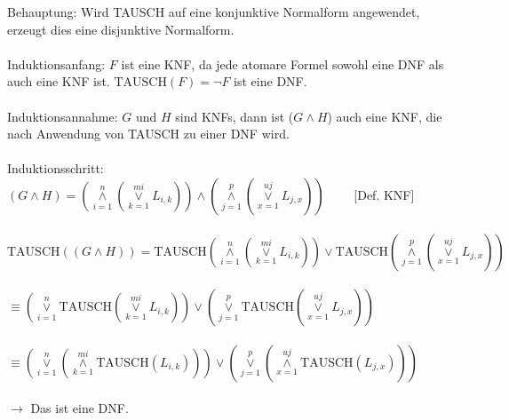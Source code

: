 \documentclass[a4paper,10pt]{scrartcl}
\begin{document}
\begin{enumerate}
\begin{enumerate}[1.]
 Behauptung: Wird TAUSCH auf eine konjunktive Normalform angewendet, erzeugt dies eine disjunktive Normalform. \\
 \\
 Induktionsanfang: $F$ ist eine KNF, da jede atomare Formel sowohl eine DNF als auch eine KNF ist.
 $\text{TAUSCH}(F) = \neg F$ ist eine DNF. \\
 \\
 Induktionsannahme: $G$ und $H$ sind KNFs, dann ist ($G \wedge H$) auch eine KNF, die nach Anwendung von TAUSCH zu
 einer DNF wird. \\
 \\
 Induktionsschritt: \\
	$(G \wedge H) = (\overset{n}{\underset{i=1}{\wedge}} (\overset{mi}{\underset{k=1}{\vee}} L_{i,k})) \wedge
	(\overset{p}{\underset{j=1}{\wedge}} (\overset{uj}{\underset{x=1}{\vee}} L_{j,x}))\quad \quad $ [Def. KNF] \\ \\
	$\text{TAUSCH}((G\wedge H)) = \text{TAUSCH}(\overset{n}{\underset{i=1}{\wedge}} (\overset{mi}{\underset{k=1}{\vee}} L_{i,k})) \vee \text{TAUSCH}(\overset{p}{\underset{j=1}{\wedge}} (\overset{uj}{\underset{x=1}{\vee}} L_{j,x}))$ \\ \\
	$\equiv (\overset{n}{\underset{i=1}{\vee}} \text{TAUSCH}(\overset{mi}{\underset{k=1}{\vee}} L_{i,k})) \vee (\overset{p}{\underset{j=1}{\vee}} \text{TAUSCH}(\overset{uj}{\underset{x=1}{\vee}} L_{j,x}))$ \\ \\
	$\equiv (\overset{n}{\underset{i=1}{\vee}} (\overset{mi}{\underset{k=1}{\wedge}} \text{TAUSCH}(L_{i,k}))) \vee (\overset{p}{\underset{j=1}{\vee}} (\overset{uj}{\underset{x=1}{\wedge}} \text{TAUSCH}(L_{j,x})))$ \\ \\
	$\rightarrow $ Das ist eine DNF.


\end{enumerate}
\end{enumerate}
\end{document}
